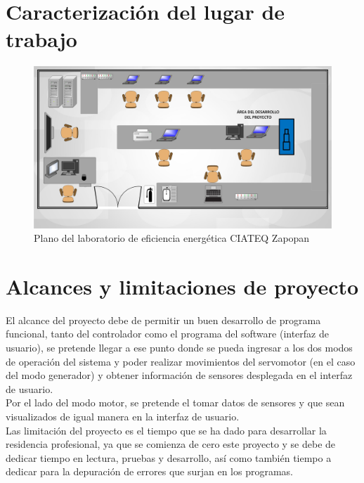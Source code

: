 \documentclass[12pt,titlepage]{article}
\begin{document}
\section{Caracterización del lugar de trabajo}
\begin{figure}[htbp]
\hspace*{-.15cm} 
\includegraphics[scale=0.245]{lab2}
\caption{Plano del laboratorio de eficiencia energética CIATEQ Zapopan }
\end{figure}
\newpage
\section{Alcances y limitaciones de proyecto}
El alcance del proyecto debe de permitir un buen desarrollo de programa funcional, tanto del controlador como el programa del software (interfaz de usuario), se pretende llegar a ese punto donde se pueda ingresar a los dos modos de operación del sistema y poder realizar movimientos del servomotor (en el caso del modo generador) y obtener información de sensores desplegada en el interfaz de usuario. \\[2.5mm]
Por el lado del modo motor, se pretende el tomar datos de sensores y que sean visualizados de igual manera en la interfaz de usuario. \\[0.1mm]



Las limitación del proyecto es el tiempo que se ha dado para desarrollar la residencia profesional, ya que se comienza de cero este proyecto y se debe de dedicar tiempo en lectura, pruebas y desarrollo, así como también tiempo a dedicar para la depuración de errores que surjan en los programas. \\[0.8mm]
\end{document}
